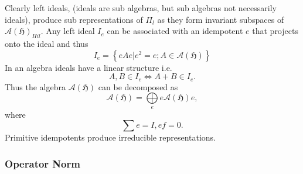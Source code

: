\documentclass[aps,preprint]{revtex4}%
\begin{document}
Clearly left ideals, (ideals are sub algebras, but sub algebras not
necessarily ideals), produce sub representations of $\Pi_{l}$ as they form
invariant subspaces of $\mathcal{A}\left(  \mathfrak{H}\right)  _{Hil}.$ Any
left ideal $I_{e}$ can be associated with an idempotent $e$ that projects onto
the ideal and thus%
\begin{equation}
I_{e}=\left\{  \left.  eAe\right\vert e^{2}=e;A\in\mathcal{A}\left(
\mathfrak{H}\right)  \right\}
\end{equation}
In an algebra ideals have a linear structure i.e.
\begin{equation}
A,B\in I_{e}\Leftrightarrow A+B\in I_{e}.
\end{equation}
Thus the algebra $\mathcal{A}\left(  \mathfrak{H}\right)  $ can be decomposed
as
\begin{equation}
\mathcal{A}\left(  \mathfrak{H}\right)  =%
{\displaystyle\bigoplus\limits_{e}}
e\mathcal{A}\left(  \mathfrak{H}\right)  e,
\end{equation}
where
\begin{equation}%
{\displaystyle\sum}
e=I,ef=0.
\end{equation}
Primitive idempotents produce irreducible representations.

\subsubsection{Operator Norm}%
\end{document}
